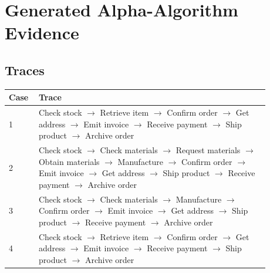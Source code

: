 \section{Generated Alpha-Algorithm Evidence}
\subsection{Traces}
\begin{longtable}{p{0.08\linewidth}p{0.80\linewidth}}
\toprule
Case & Trace \\
\midrule
1 & Check stock $\rightarrow$ Retrieve item $\rightarrow$ Confirm order $\rightarrow$ Get address $\rightarrow$ Emit invoice $\rightarrow$ Receive payment $\rightarrow$ Ship product $\rightarrow$ Archive order \\
2 & Check stock $\rightarrow$ Check materials $\rightarrow$ Request materials $\rightarrow$ Obtain materials $\rightarrow$ Manufacture $\rightarrow$ Confirm order $\rightarrow$ Emit invoice $\rightarrow$ Get address $\rightarrow$ Ship product $\rightarrow$ Receive payment $\rightarrow$ Archive order \\
3 & Check stock $\rightarrow$ Check materials $\rightarrow$ Manufacture $\rightarrow$ Confirm order $\rightarrow$ Emit invoice $\rightarrow$ Get address $\rightarrow$ Ship product $\rightarrow$ Receive payment $\rightarrow$ Archive order \\
4 & Check stock $\rightarrow$ Retrieve item $\rightarrow$ Confirm order $\rightarrow$ Get address $\rightarrow$ Emit invoice $\rightarrow$ Receive payment $\rightarrow$ Ship product $\rightarrow$ Archive order \\
\bottomrule
\end{longtable}
